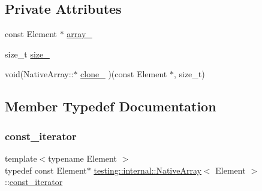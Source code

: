 \subsection*{Private Attributes}
\begin{DoxyCompactItemize}
\item 
const Element $\ast$ \mbox{\hyperlink{classtesting_1_1internal_1_1_native_array_acf61ba53a7fe308f1fa9e51aad43116b}{array\+\_\+}}
\item 
size\+\_\+t \mbox{\hyperlink{classtesting_1_1internal_1_1_native_array_aa7e4251de39aaa75f697f0eaeedbf06e}{size\+\_\+}}
\item 
void(Native\+Array\+::$\ast$ \mbox{\hyperlink{classtesting_1_1internal_1_1_native_array_acefd29caf2f39f98027875c95bdf9af4}{clone\+\_\+}} )(const Element $\ast$, size\+\_\+t)
\end{DoxyCompactItemize}


\subsection{Member Typedef Documentation}
\mbox{\label{classtesting_1_1internal_1_1_native_array_a9ce7c8408460d7158a2870456d134557}} 
\subsubsection{\texorpdfstring{const\_iterator}{const\_iterator}\hspace{0.1cm}{\footnotesize\ttfamily [1/3]}}
{\footnotesize\ttfamily template$<$typename Element $>$ \\
typedef const Element$\ast$ \mbox{\hyperlink{classtesting_1_1internal_1_1_native_array}{testing\+::internal\+::\+Native\+Array}}$<$ Element $>$\+::\mbox{\hyperlink{classtesting_1_1internal_1_1_native_array_a9ce7c8408460d7158a2870456d134557}{const\+\_\+iterator}}}

\mbox{\label{classtesting_1_1internal_1_1_native_array_a9ce7c8408460d7158a2870456d134557}} 
